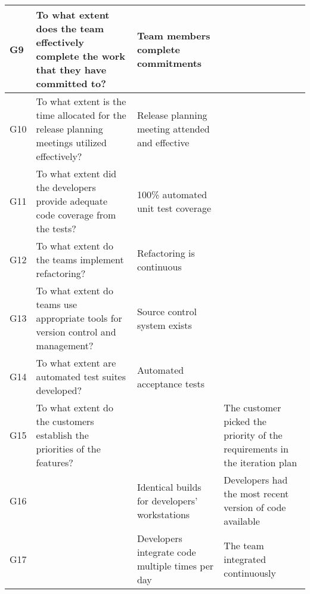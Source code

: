 \begin{longtable} {| p{1.5cm} | p{4.8cm} | p{3.8cm} | p{3.3cm} |}
		\label{G9} G9 & To what extent does the team effectively complete the work that they have committed to? & Team members complete commitments & \\ \hline
		\label{G10} G10 & To what extent is the time allocated for the release planning meetings utilized effectively? & Release planning meeting attended and effective & \\ \hline
		\label{G11} G11 & To what extent did the developers provide adequate code coverage from the tests? & 100\% automated unit test coverage & \\ \hline
		\label{G12} G12 & To what extent do the teams implement refactoring? & Refactoring is continuous & \\ \hline
		\label{G13} G13 & To what extent do teams use appropriate tools for version control and management? & Source control system exists & \\ \hline
		\label{G14} G14 & To what extent are automated test suites developed? & Automated acceptance tests & \\ \hline
		\label{G15} G15 & To what extent do the customers establish the priorities of the features? & & The customer picked the priority of the requirements in the iteration plan \\ \hline
		\label{G16} G16 & & Identical builds for developers’ workstations & Developers had the most recent version of code available \\ \hline
		\label{G17} G17 & & Developers integrate code multiple times per day & The team integrated continuously \\ \hline
		\end{longtable}

